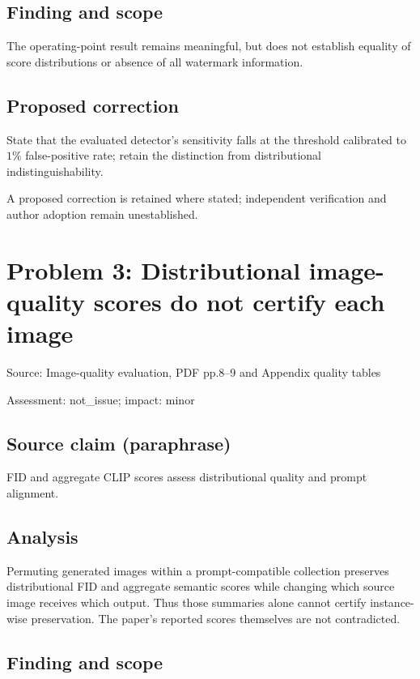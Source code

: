 \documentclass[11pt]{article}
\begin{document}
\subsection*{Finding and scope}

The operating-point result remains meaningful, but does not establish equality of score distributions or absence of all watermark information.

\subsection*{Proposed correction}

State that the evaluated detector’s sensitivity falls at the threshold calibrated to \(1\%\) false-positive rate; retain the distinction from distributional indistinguishability.

A proposed correction is retained where stated; independent verification and author adoption remain unestablished.

\section*{Problem 3: Distributional image-quality scores do not certify each image}

Source: Image-quality evaluation, PDF pp.8–9 and Appendix quality tables

Assessment: not\_issue; impact: minor

\subsection*{Source claim (paraphrase)}

FID and aggregate CLIP scores assess distributional quality and prompt alignment.

\subsection*{Analysis}

Permuting generated images within a prompt-compatible collection preserves distributional FID and aggregate semantic scores while changing which source image receives which output. Thus those summaries alone cannot certify instance-wise preservation. The paper’s reported scores themselves are not contradicted.

\subsection*{Finding and scope}
\end{document}
